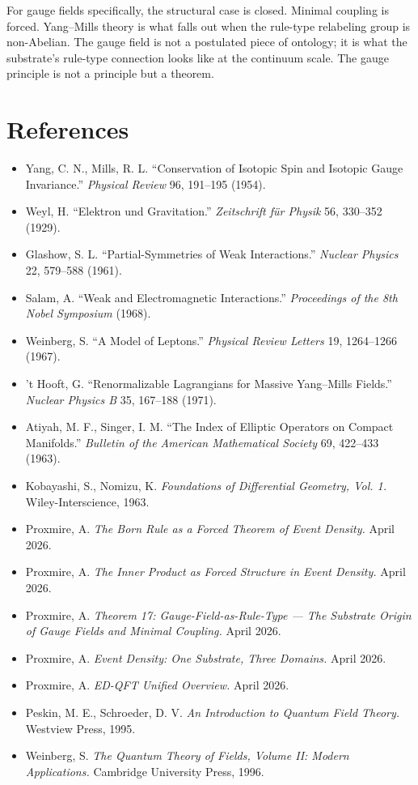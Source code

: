 \documentclass[11pt,a4paper]{article}
\begin{document}
For gauge fields specifically, the structural case is closed. Minimal coupling is forced. Yang--Mills theory is what falls out when the rule-type relabeling group is non-Abelian. The gauge field is not a postulated piece of ontology; it is what the substrate's rule-type connection looks like at the continuum scale. The gauge principle is not a principle but a theorem.

\section*{References}

\begin{itemize}[leftmargin=*,itemsep=2pt]
  \item Yang, C. N., Mills, R. L. ``Conservation of Isotopic Spin and Isotopic Gauge Invariance.'' \emph{Physical Review} 96, 191--195 (1954).
  \item Weyl, H. ``Elektron und Gravitation.'' \emph{Zeitschrift f\"ur Physik} 56, 330--352 (1929).
  \item Glashow, S. L. ``Partial-Symmetries of Weak Interactions.'' \emph{Nuclear Physics} 22, 579--588 (1961).
  \item Salam, A. ``Weak and Electromagnetic Interactions.'' \emph{Proceedings of the 8th Nobel Symposium} (1968).
  \item Weinberg, S. ``A Model of Leptons.'' \emph{Physical Review Letters} 19, 1264--1266 (1967).
  \item 't Hooft, G. ``Renormalizable Lagrangians for Massive Yang--Mills Fields.'' \emph{Nuclear Physics B} 35, 167--188 (1971).
  \item Atiyah, M. F., Singer, I. M. ``The Index of Elliptic Operators on Compact Manifolds.'' \emph{Bulletin of the American Mathematical Society} 69, 422--433 (1963).
  \item Kobayashi, S., Nomizu, K. \emph{Foundations of Differential Geometry, Vol. 1.} Wiley-Interscience, 1963.
  \item Proxmire, A. \emph{The Born Rule as a Forced Theorem of Event Density.} April 2026.
  \item Proxmire, A. \emph{The Inner Product as Forced Structure in Event Density.} April 2026.
  \item Proxmire, A. \emph{Theorem 17: Gauge-Field-as-Rule-Type --- The Substrate Origin of Gauge Fields and Minimal Coupling.} April 2026.
  \item Proxmire, A. \emph{Event Density: One Substrate, Three Domains.} April 2026.
  \item Proxmire, A. \emph{ED-QFT Unified Overview.} April 2026.
  \item Peskin, M. E., Schroeder, D. V. \emph{An Introduction to Quantum Field Theory.} Westview Press, 1995.
  \item Weinberg, S. \emph{The Quantum Theory of Fields, Volume II: Modern Applications.} Cambridge University Press, 1996.
\end{itemize}
\end{document}
